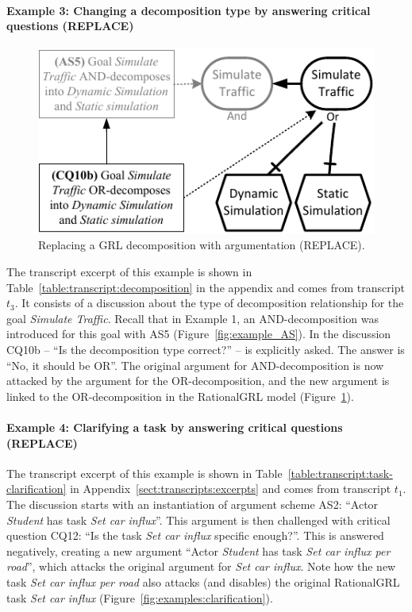 \paragraph{Example 3: Changing a decomposition type by answering critical questions (\textsf{REPLACE})} 

\begin{figure}[t]
\centering
\includegraphics[]{img/fig_example_replace.pdf}
\caption{Replacing a GRL decomposition with argumentation (\textsf{REPLACE)}.}
\label{fig:examples:decomposition}
\end{figure}

The transcript excerpt of this example is shown in Table~\ref{table:transcript:decomposition} in the appendix and comes from transcript $t_3$. It consists of a discussion about the type of decomposition relationship for the goal \emph{Simulate Traffic}. Recall that in Example 1, an AND-decomposition was introduced for this goal with AS5 (Figure~\ref{fig:example_AS}). In the discussion CQ10b -- ``Is the decomposition type correct?'' -- is explicitly asked. The answer is ``No, it should be OR''. The original argument for AND-decomposition is now attacked  by the argument for the OR-decomposition, and the new argument is linked to the OR-decomposition in the RationalGRL model (Figure~\ref{fig:examples:decomposition}). 

\paragraph{Example 4: Clarifying a task by answering critical questions (\textsf{REPLACE})}

The transcript excerpt of this example is shown in Table~\ref{table:transcript:task-clarification} in Appendix~\ref{sect:transcripts:excerpts} and comes from transcript $t_1$. The discussion starts with an instantiation of argument scheme AS2: ``Actor \emph{Student} has task \emph{Set car influx}''. This argument is then challenged with critical question CQ12: ``Is the task \emph{Set car influx} specific enough?''. This is answered negatively, creating a new argument ``Actor \emph{Student} has task \emph{Set car influx per road}'', which attacks the original argument for \emph{Set car influx}. Note how the new task \emph{Set car influx per road} also attacks (and disables) the original RationalGRL task \emph{Set car influx} (Figure~\ref{fig:examples:clarification}). 

